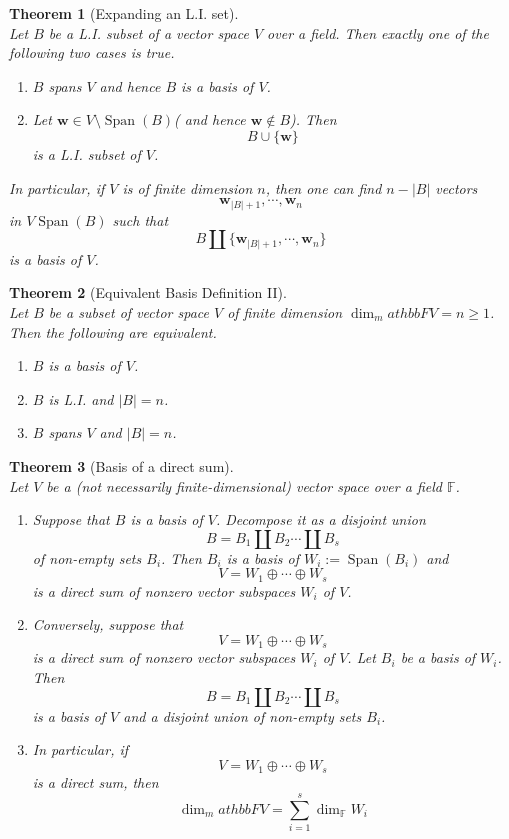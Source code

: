 \documentclass[12pt]{article}
\newtheorem{theorem}{Theorem}[section]
\theoremstyle{definition}
\DeclareMathOperator{\spn}{Span}
\begin{document}
\begin{theorem}[Expanding an L.I. set]
\hfill\\\normalfont Let $B$ be a L.I. subset of a vector space $V$ over a field. Then exactly one of the following two cases is true.
\begin{enumerate}[label=(\arabic*)]
\item $B$ spans $V$ and hence $B$ is a basis of $V$.
\item Let $\mathbf{w}\in V\setminus\spn(B)$( and hence $\mathbf{w}\notin B$). Then
\[
B\cup\{\mathbf{w}\}
\]
is a L.I. subset of $V$.
\end{enumerate}
In particular, if $V$ is of finite dimension $n$, then one can find $n-|B|$ vectors 
\[
\mathbf{w}_{|B|+1},\cdots,\mathbf{w}_n
\]
in $V\spn(B)$ such that 
\[
B\coprod\{\mathbf{w}_{|B|+1},\cdots,\mathbf{w}_n\}
\]
is a basis of $V$.
\end{theorem}
\begin{theorem}[Equivalent Basis Definition II]
\hfill\\\normalfont Let $B$ be a subset of vector space $V$ of finite dimension $\dim_mathbb{F}V = n\geq 1$. Then the following are equivalent.
\begin{enumerate}[label=(\arabic*)]
\item $B$ is a basis of $V$.
\item $B$ is L.I. and $|B|=n$.
\item $B$ spans $V$ and $|B|=n$.
\end{enumerate}
\end{theorem}
\begin{theorem}[Basis of a direct sum]
\hfill\\\normalfont Let $V$ be a (not necessarily finite-dimensional) vector space over a field $\mathbb{F}$.
\begin{enumerate}[label=(\arabic*)]
\item Suppose that $B$ is a basis of $V$. Decompose it as a disjoint union
\[
B=B_1\coprod B_2\cdots\coprod B_s
\]
of non-empty sets $B_i$. Then $B_i$ is a basis of $W_i:=\spn(B_i)$ and
\[
V=W_1\oplus\cdots\oplus W_s
\]
is a direct sum of nonzero vector subspaces $W_i$ of $V$.
\item Conversely, suppose that
\[
V=W_1\oplus\cdots\oplus W_s
\]
is a direct sum of nonzero vector subspaces $W_i$ of $V$. Let $B_i$ be a basis of $W_i$. Then
\[
B=B_1\coprod B_2\cdots\coprod B_s
\]
is a basis of $V$ and a disjoint union of non-empty sets $B_i$.
\item In particular, if
\[
V=W_1\oplus\cdots\oplus W_s
\]
is a direct sum, then
\[
\dim_mathbb{F}V=\sum_{i=1}^s\dim_\mathbb{F}W_i
\]
\end{enumerate}
\end{theorem}
\clearpage
\end{document}
